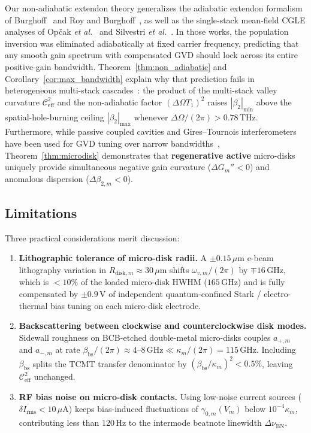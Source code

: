 \documentclass[11pt,letterpaper]{article}
\begin{document}
Our non-adiabatic extendon theory generalizes the adiabatic extendon formalism of Burghoff~\cite{Burghoff2020} and Roy and Burghoff~\cite{RoyBurghoffRoadmap2025}, as well as the single-stack mean-field CGLE analyses of Op\v{c}ak \textit{et al.}~\cite{Opa2021} and Silvestri \textit{et al.}~\cite{Silvestri2023,SilvestriRoadmap2025}. In those works, the population inversion was eliminated adiabatically at fixed carrier frequency, predicting that any smooth gain spectrum with compensated GVD should lock across its entire positive-gain bandwidth. Theorem~\ref{thm:non_adiabatic} and Corollary~\ref{cor:max_bandwidth} explain why that prediction fails in heterogeneous multi-stack cascades~\cite{Jaidl2021,JaidlUnterrainerRoadmap2025}: the product of the multi-stack valley curvature $\mathcal{C}_{\mathrm{eff}}^2$ and the non-adiabatic factor $(\Delta\Omega T_1)^2$ raises $|\beta_2|_{\min}$ above the spatial-hole-burning ceiling $|\beta_2|_{\max}$ whenever $\Delta\Omega/(2\pi) > 0.78\,\mathrm{THz}$. Furthermore, while passive coupled cavities and Gires--Tournois interferometers have been used for GVD tuning over narrow bandwidths~\cite{Villares2016,Garrasi2019}, Theorem~\ref{thm:microdisk} demonstrates that \textbf{regenerative active} micro-disks uniquely provide simultaneous negative gain curvature ($\Delta G_m'' < 0$) and anomalous dispersion ($\Delta\beta_{2,m} < 0$).

\subsection{Limitations}
\label{subsec:limitations}

Three practical considerations merit discussion:
\begin{enumerate}
    \item \textbf{Lithographic tolerance of micro-disk radii.} A $\pm 0.15\,\mu\mathrm{m}$ e-beam lithography variation in $R_{\mathrm{disk},m} \approx 30\,\mu\mathrm{m}$ shifts $\omega_{v,m}/(2\pi)$ by $\mp 16\,\mathrm{GHz}$, which is $<10\%$ of the loaded micro-disk HWHM ($165\,\mathrm{GHz}$) and is fully compensated by $\pm 0.9\,\mathrm{V}$ of independent quantum-confined Stark / electro-thermal bias tuning on each micro-disk electrode.
    \item \textbf{Backscattering between clockwise and counterclockwise disk modes.} Sidewall roughness on BCB-etched double-metal micro-disks couples $a_{+,m}$ and $a_{-,m}$ at rate $\beta_{\mathrm{bs}}/(2\pi) \approx 4\text{--}8\,\mathrm{GHz} \ll \kappa_m/(2\pi) = 115\,\mathrm{GHz}$. Including $\beta_{\mathrm{bs}}$ splits the TCMT transfer denominator by $(\beta_{\mathrm{bs}}/\kappa_m)^2 < 0.5\%$, leaving $\mathcal{C}_{\mathrm{eff}}^2$ unchanged.
    \item \textbf{RF bias noise on micro-disk contacts.} Using low-noise current sources ($\delta I_{\mathrm{rms}} < 10\,\mu\mathrm{A}$) keeps bias-induced fluctuations of $\gamma_{0,m}(V_m)$ below $10^{-4}\kappa_m$, contributing less than $120\,\mathrm{Hz}$ to the intermode beatnote linewidth $\Delta\nu_{\mathrm{BN}}$.
\end{enumerate}
\end{document}
